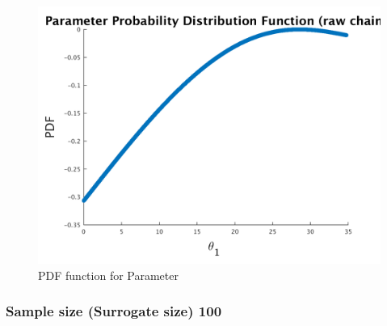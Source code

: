 \begin{figure}[h!]
  
  \centering
   \includegraphics[scale=0.75]{output_50/ip_logLike_unified}
   \caption{PDF function for Parameter }
\end{figure}



\subsubsection{Sample size (Surrogate size) 100 }

